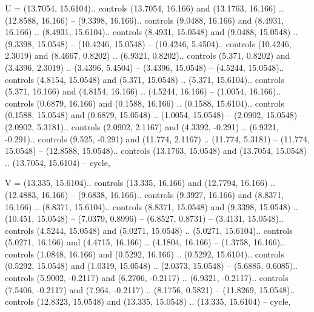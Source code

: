 U = {(13.7054, 15.6104).. controls (13.7054, 16.166) and (13.1763, 16.166) .. (12.8588, 16.166) -- (9.3398, 16.166).. controls (9.0488, 16.166) and (8.4931, 16.166) .. (8.4931, 15.6104).. controls (8.4931, 15.0548) and (9.0488, 15.0548) .. (9.3398, 15.0548) -- (10.4246, 15.0548) -- (10.4246, 5.4504).. controls (10.4246, 2.3019) and (8.4667, 0.8202) .. (6.9321, 0.8202).. controls (5.371, 0.8202) and (3.4396, 2.3019) .. (3.4396, 5.4504) -- (3.4396, 15.0548) -- (4.5244, 15.0548).. controls (4.8154, 15.0548) and (5.371, 15.0548) .. (5.371, 15.6104).. controls (5.371, 16.166) and (4.8154, 16.166) .. (4.5244, 16.166) -- (1.0054, 16.166).. controls (0.6879, 16.166) and (0.1588, 16.166) .. (0.1588, 15.6104).. controls (0.1588, 15.0548) and (0.6879, 15.0548) .. (1.0054, 15.0548) -- (2.0902, 15.0548) -- (2.0902, 5.3181).. controls (2.0902, 2.1167) and (4.3392, -0.291) .. (6.9321, -0.291).. controls (9.525, -0.291) and (11.774, 2.1167) .. (11.774, 5.3181) -- (11.774, 15.0548) -- (12.8588, 15.0548).. controls (13.1763, 15.0548) and (13.7054, 15.0548) .. (13.7054, 15.6104) -- cycle},

V = {(13.335, 15.6104).. controls (13.335, 16.166) and (12.7794, 16.166) .. (12.4883, 16.166) -- (9.6838, 16.166).. controls (9.3927, 16.166) and (8.8371, 16.166) .. (8.8371, 15.6104).. controls (8.8371, 15.0548) and (9.3398, 15.0548) .. (10.451, 15.0548) -- (7.0379, 0.8996) -- (6.8527, 0.8731) -- (3.4131, 15.0548).. controls (4.5244, 15.0548) and (5.0271, 15.0548) .. (5.0271, 15.6104).. controls (5.0271, 16.166) and (4.4715, 16.166) .. (4.1804, 16.166) -- (1.3758, 16.166).. controls (1.0848, 16.166) and (0.5292, 16.166) .. (0.5292, 15.6104).. controls (0.5292, 15.0548) and (1.0319, 15.0548) .. (2.0373, 15.0548) -- (5.6885, 0.6085).. controls (5.9002, -0.2117) and (6.2706, -0.2117) .. (6.9321, -0.2117).. controls (7.5406, -0.2117) and (7.964, -0.2117) .. (8.1756, 0.5821) -- (11.8269, 15.0548).. controls (12.8323, 15.0548) and (13.335, 15.0548) .. (13.335, 15.6104) -- cycle},

